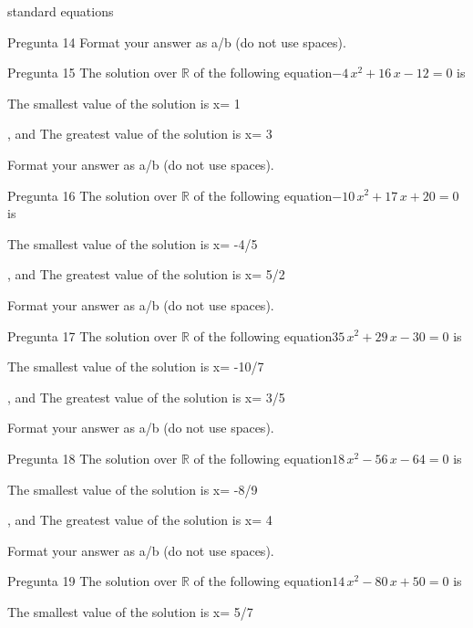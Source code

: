 \begin{quiz}{standard equations }
\begin{cloze}{Pregunta 14 }
Format your answer as a/b (do not use spaces).\end{cloze}\begin{cloze}{Pregunta 15 } The solution over $\mathbb{R}$ of the following equation$ -4\,x^2+16\,x-12=0  $ is 
\begin{shortanswer}The smallest value of the solution is x=  1 \end{shortanswer}
\begin{shortanswer}, and  The greatest value of the solution is x=  3 \end{shortanswer}
Format your answer as a/b (do not use spaces).\end{cloze}\begin{cloze}{Pregunta 16 } The solution over $\mathbb{R}$ of the following equation$ -10\,x^2+17\,x+20=0  $ is 
\begin{shortanswer}The smallest value of the solution is x=  -4/5 \end{shortanswer}
\begin{shortanswer}, and  The greatest value of the solution is x=  5/2 \end{shortanswer}
Format your answer as a/b (do not use spaces).\end{cloze}\begin{cloze}{Pregunta 17 } The solution over $\mathbb{R}$ of the following equation$ 35\,x^2+29\,x-30=0  $ is 
\begin{shortanswer}The smallest value of the solution is x=  -10/7 \end{shortanswer}
\begin{shortanswer}, and  The greatest value of the solution is x=  3/5 \end{shortanswer}
Format your answer as a/b (do not use spaces).\end{cloze}\begin{cloze}{Pregunta 18 } The solution over $\mathbb{R}$ of the following equation$ 18\,x^2-56\,x-64=0  $ is 
\begin{shortanswer}The smallest value of the solution is x=  -8/9 \end{shortanswer}
\begin{shortanswer}, and  The greatest value of the solution is x=  4 \end{shortanswer}
Format your answer as a/b (do not use spaces).\end{cloze}\begin{cloze}{Pregunta 19 } The solution over $\mathbb{R}$ of the following equation$ 14\,x^2-80\,x+50=0  $ is 
\begin{shortanswer}The smallest value of the solution is x=  5/7 \end{shortanswer}

\end{cloze}
\end{quiz}
